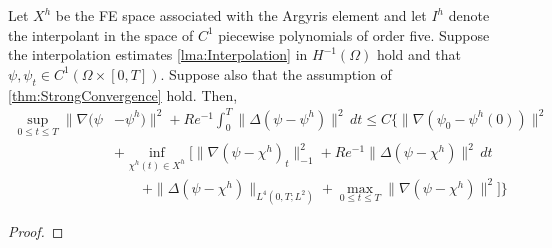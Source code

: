 \begin{lemma} \label{lma:Interpolation}

\end{lemma}

\begin{thm} \label{thm:SemiInterp}
  Let $X^h$ be the FE space associated with the Argyris element and let $I^h$
  denote the interpolant in the space of $C^1$ piecewise polynomials of order
  five. Suppose the interpolation estimates \autoref{lma:Interpolation}
  in $H^{-1}(\Omega)$ hold and that $\psi, \psi_t \in C^1(\Omega\times [0,T])$.
  Suppose also that the assumption of \autoref{thm:StrongConvergence} hold.
  Then,
  \begin{equation}
    \begin{split}
      \sup_{0\le t \le T} \|\nabla (\psi &- \psi^h) \|^2 + Re^{-1}
        \int_{0}^{T}\! \|\Delta (\psi - \psi^h)\|^2 \, dt \le C\biggl\{
          \|\nabla(\psi_0 - \psi^h(0))\|^2 \\
        & + \inf_{\chi^h(t) \in X^h} \biggl[\|\nabla(\psi - \chi^h)_t\|^2_{-1} +
          Re^{-1} \|\Delta(\psi - \chi^h)\|^2\, dt \\
        & \qquad + \|\Delta(\psi - \chi^h)\|_{L^4(0,T;L^2)} + \max_{0 \le t \le T}
          \|\nabla (\psi - \chi^h)\|^2\biggr] \biggr\}
    \end{split}
    \label{eqn:SemiInterp}
  \end{equation}
\end{thm}
\begin{proof}

\end{proof}
